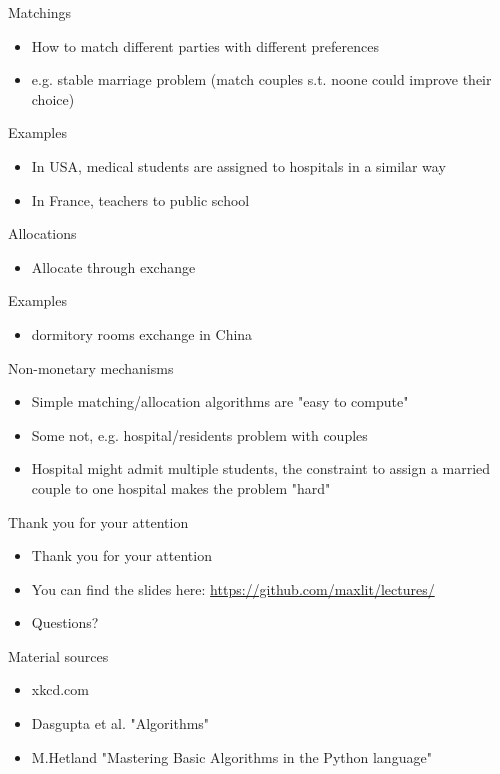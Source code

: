 \documentclass[presentation]{beamer}
\begin{document}
\begin{frame}[label=sec-3-22]{Matchings}
\begin{itemize}
\item How to match different parties with different preferences
\item e.g. stable marriage problem (match couples s.t. noone could improve their choice)
\end{itemize}
\begin{block}{Examples}
\begin{itemize}
\item In USA, medical students are assigned to hospitals in a similar way
\item In France, teachers to public school
\end{itemize}
\end{block}
\end{frame}
\begin{frame}[label=sec-3-23]{Allocations}
\begin{itemize}
\item Allocate through exchange
\end{itemize}
\begin{block}{Examples}
\begin{itemize}
\item dormitory rooms exchange in China
\end{itemize}
\end{block}
\end{frame}
\begin{frame}[label=sec-3-24]{Non-monetary mechanisms}
\begin{itemize}
\item Simple matching/allocation algorithms are "easy to compute"
\item Some not, e.g. hospital/residents problem with couples
\item Hospital might admit multiple students, the constraint to assign a married couple to one hospital makes the problem "hard"
\end{itemize}
\end{frame}
\begin{frame}[label=sec-3-25]{Thank you for your attention}
\begin{itemize}
\item Thank you for your attention
\item You can find the slides here: \url{https://github.com/maxlit/lectures/}
\item Questions?
\end{itemize}
\end{frame}
\begin{frame}[label=sec-3-26]{Material sources}
\begin{itemize}
\item xkcd.com
\item Dasgupta et al. "Algorithms"
\item M.Hetland "Mastering Basic Algorithms in the Python language"
\end{itemize}
\end{frame}
\end{document}
